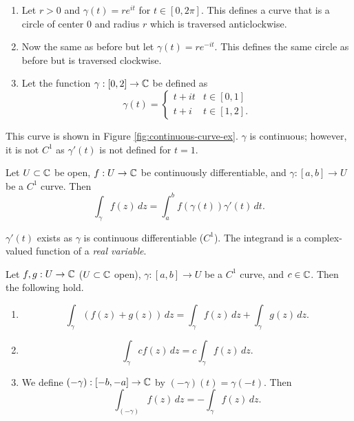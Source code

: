 \begin{example}
    \begin{enumerate}
        \item Let $r > 0$ and $\gamma(t) = re^{it}$ for $t \in [0, 2\pi]$.
            This defines a curve that is a circle of center $0$ and radius $r$ 
            which is traversed anticlockwise.

        \item Now the same as before but let $\gamma(t) = re^{-it}$. 
            This defines the same circle as before but is traversed clockwise.

        \item Let the function $\gamma: [0, 2] \to \mathbb{C}$ be defined as
            \[
                \gamma(t) =
                \begin{cases}
                    t + it & t \in [0, 1] \\
                    t + i  & t \in [1, 2].
                \end{cases}
            \]
    \end{enumerate}
    This curve is shown in Figure \ref{fig:continuous-curve-ex}.
    $\gamma$ is continuous; however, it is not $C^1$ as $\gamma'(t)$ is not defined
    for $t = 1$.
\end{example}

\begin{definition}
    Let $U \subset \mathbb{C}$ be open, 
    $f: U \to \mathbb{C}$ be continuously differentiable, 
    and $\gamma: [a, b] \to U$ be a $C^1$ curve.
    Then
    \[ \int_\gamma f(z) \, dz = \int_a^b f(\gamma(t)) \gamma'(t) \, dt.\]
\end{definition}

\begin{remark}
    $\gamma'(t)$ exists as $\gamma$ is continuous differentiable ($C^1$).
    The integrand is a complex-valued function of a \emph{real variable}.
\end{remark}

\begin{proposition}
    Let $f, g: U \to \mathbb{C}$ ($U \subset \mathbb{C}$ open), $\gamma: [a, b] \to U$ be a $C^1$ curve,
    and $c \in \mathbb{C}$. Then the following hold.
    \begin{enumerate}
        \item 
            \[ \int_\gamma(f(z) + g(z))\,dz = \int_\gamma f(z) \, dz + \int_\gamma g(z) \, dz. \]

        \item 
            \[ \int_\gamma cf(z) \, dz = c \int_\gamma f(z) \, dz. \]

        \item We define $(-\gamma): [-b, -a] \to \mathbb{C}$ by $(-\gamma)(t) = \gamma(-t)$. Then
            \[ \int_{(-\gamma)} f(z) \, dz = - \int_\gamma f(z) \, dz. \]
    \end{enumerate}
\end{proposition}

